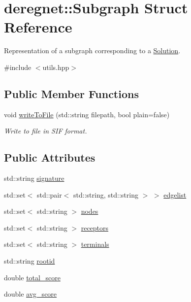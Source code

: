 \hypertarget{structderegnet_1_1Subgraph}{}\section{deregnet\+:\+:Subgraph Struct Reference}
\label{structderegnet_1_1Subgraph}


Representation of a subgraph corresponding to a \hyperlink{structderegnet_1_1Solution}{Solution}.  




{\ttfamily \#include $<$utils.\+hpp$>$}

\subsection*{Public Member Functions}
\begin{DoxyCompactItemize}
\item 
void \hyperlink{structderegnet_1_1Subgraph_ad82c2a1c9c43701b0239f3c32e120d82}{write\+To\+File} (std\+::string filepath, bool plain=false)
\begin{DoxyCompactList}\small\item\em Write to file in S\+IF format. \end{DoxyCompactList}\end{DoxyCompactItemize}
\subsection*{Public Attributes}
\begin{DoxyCompactItemize}
\item 
std\+::string \hyperlink{structderegnet_1_1Subgraph_aae642b8b0b71de5539218040b0d7e201}{signature}
\item 
std\+::set$<$ std\+::pair$<$ std\+::string, std\+::string $>$ $>$ \hyperlink{structderegnet_1_1Subgraph_a918a816236f30355b2ec812af629db09}{edgelist}
\item 
std\+::set$<$ std\+::string $>$ \hyperlink{structderegnet_1_1Subgraph_a6f8b8d288c1314cc9623e732c5b89056}{nodes}
\item 
std\+::set$<$ std\+::string $>$ \hyperlink{structderegnet_1_1Subgraph_a2a818ffe02ceced905ef38cb9a5253df}{receptors}
\item 
std\+::set$<$ std\+::string $>$ \hyperlink{structderegnet_1_1Subgraph_a030ed025dd1e2e38c48147283a93bd61}{terminals}
\item 
std\+::string \hyperlink{structderegnet_1_1Subgraph_a0e214a14649dcd35959c619cbdd9ce2b}{rootid}
\item 
double \hyperlink{structderegnet_1_1Subgraph_a3fdd10c0e803822ae09a71e5b549e471}{total\+\_\+score}
\item 
double \hyperlink{structderegnet_1_1Subgraph_ad2836fb4bf0db09a91363f5fc894a02a}{avg\+\_\+score}
\end{DoxyCompactItemize}


